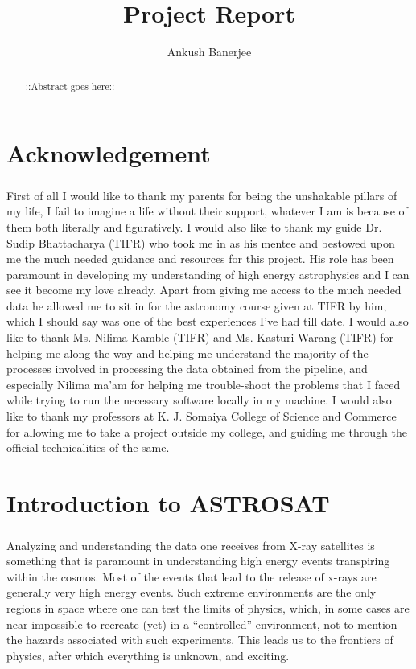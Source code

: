 \documentclass[a4paper,twoside]{report}
\title{Project Report}
\author{Ankush Banerjee}
\numberwithin{equation}{section}
\begin{document}
\maketitle
\begin{abstract}::Abstract goes here::
\end{abstract}
\newpage
\tableofcontents{}
\newpage
\chapter{Acknowledgement}
\paragraph{}
First of all I would like to thank my parents for being the unshakable pillars of my life, I fail to imagine a life without their support, whatever I am is because of them both literally and figuratively. I would also like to thank my guide Dr. Sudip Bhattacharya (TIFR) who took me in as his mentee and bestowed upon me the much needed guidance and resources for this project. His role has been paramount in developing my understanding of high energy astrophysics and I can see it become my love already. Apart from giving me access to the much needed data he allowed me to sit in for the astronomy course given at TIFR by him, which I should say was one of the best experiences I've had till date. I would also like to thank Ms. Nilima Kamble (TIFR) and Ms. Kasturi Warang (TIFR) for helping me along the way and helping me understand the majority of the processes involved in processing the data obtained from the pipeline, and especially Nilima ma'am for helping me trouble-shoot the problems that I faced while trying to run the necessary software locally in my machine. I would also like to thank my professors at K. J. Somaiya College of Science and Commerce for allowing me to take a project outside my college, and guiding me through the official technicalities of the same. 
\newpage
\chapter{Introduction to ASTROSAT}
\paragraph{}
Analyzing and understanding the data one receives from X-ray satellites is something that is paramount in understanding high energy events transpiring within the cosmos. Most of the events that lead to the release of x-rays are generally very high energy events. Such extreme environments are the only regions in space where one can test the limits of physics, which, in some cases are near impossible to recreate (yet) in a “controlled” environment, not to mention the hazards associated with such experiments. This leads us to the frontiers of physics, after which everything is unknown, and exciting.
\end{document}

